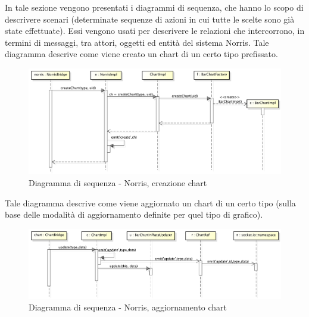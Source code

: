     	In tale sezione vengono presentati i diagrammi di sequenza, che hanno lo scopo di descrivere scenari (determinate sequenze di azioni in cui tutte le scelte sono già state effettuate). Essi vengono usati per descrivere le relazioni che intercorrono, in termini di messaggi, tra attori, oggetti ed entità del sistema Norris.
        	Tale diagramma descrive come viene creato un chart di un certo tipo prefissato.
            \begin{figure}[H]
                \centering
                \includegraphics[scale=0.3]{DefinizioneDiProdotto/Pics/NorrisCreazioneChart}
                \caption{Diagramma di sequenza - Norris, creazione chart}
            \end{figure}


        	Tale diagramma descrive come viene aggiornato un chart di un certo tipo (sulla base delle modalità di aggiornamento definite per quel tipo di grafico).
            \begin{figure}[H]
                \centering
                \includegraphics[scale=0.3]{DefinizioneDiProdotto/Pics/NorrisAggiornamentoChart}
                \caption{Diagramma di sequenza - Norris, aggiornamento chart}
            \end{figure}


